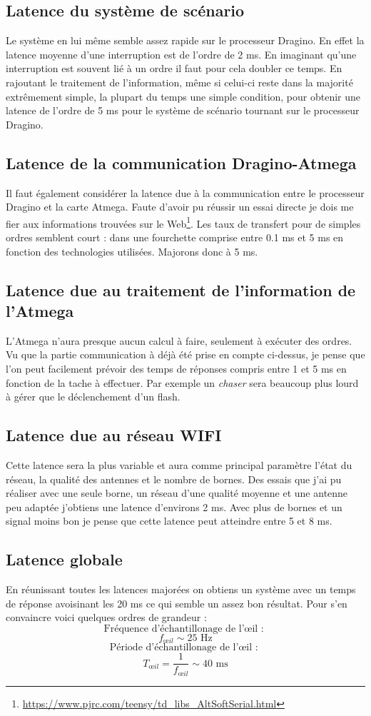 \subsection{Latence du système de scénario}
Le système en lui même semble assez rapide sur le processeur Dragino. En effet la latence moyenne d'une interruption est de l'ordre de 2 ms. En imaginant qu'une interruption est souvent lié à un ordre il faut pour cela doubler ce temps. En rajoutant le traitement de l'information, même si celui-ci reste dans la majorité extrêmement simple, la plupart du temps une simple condition, pour obtenir une latence de l'ordre de 5 ms pour le système de scénario tournant sur le processeur Dragino.
\subsection{Latence de la communication Dragino-Atmega}
Il faut également considérer la latence due à la communication entre le processeur Dragino et la carte Atmega. Faute d'avoir pu réussir un essai directe je dois me fier aux informations trouvées sur le Web\footnote{\url{https://www.pjrc.com/teensy/td_libs_AltSoftSerial.html}}. Les taux de transfert pour de simples ordres semblent court : dans une fourchette comprise entre 0.1 ms et 5 ms en fonction des technologies utilisées. Majorons donc à 5 ms.
\subsection{Latence due au traitement de l'information de l'Atmega}
L'Atmega n'aura presque aucun calcul à faire, seulement à exécuter des ordres. Vu que la partie communication à déjà été prise en compte ci-dessus, je pense que l'on peut facilement prévoir des temps de réponses compris entre 1 et 5 ms en fonction de la tache à effectuer. Par exemple un \textit{chaser} sera beaucoup plus lourd à gérer que le déclenchement d'un flash.
\subsection{Latence due au réseau WIFI}
Cette latence sera la plus variable et aura comme principal paramètre l'état du réseau, la qualité des antennes et le nombre de bornes. Des essais que j'ai pu réaliser avec une seule borne, un réseau d'une qualité moyenne et une antenne peu adaptée j'obtiens une latence d'environs 2 ms. Avec plus de bornes et un signal moins bon je pense que cette latence peut atteindre entre 5 et 8 ms.
\subsection{Latence globale}
En réunissant toutes les latences majorées on obtiens un système avec un temps de réponse avoisinant les 20 ms ce qui semble un assez bon résultat. Pour s'en convaincre voici quelques ordres de grandeur :
\[ \text{Fréquence d'échantillonage de l'œil : } \]\[ f_{œil} \sim 25 \text{ Hz} \]\[
   \text{Période d'échantillonage de l'œil : } \]\[T_{œil} = \frac{1}{f_{œil}} \sim 40 \text{~ms}\]
   
